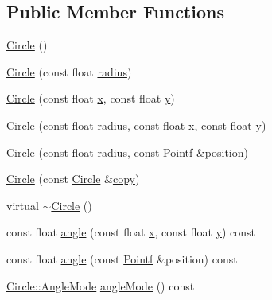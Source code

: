 \subsection*{Public Member Functions}
\begin{DoxyCompactItemize}
\item 
\hyperlink{classprism_1_1_circle_aff41793f64e90d15a4d89851b1a6b011}{Circle} ()
\item 
\hyperlink{classprism_1_1_circle_a4101ea55c7d90b63648742ef22460150}{Circle} (const float \hyperlink{classprism_1_1_circle_a75afa2c59f92909d6b6edcec338030fb}{radius})
\item 
\hyperlink{classprism_1_1_circle_aa6252ad78c2f76a1a4e15f93087bb2c6}{Circle} (const float \hyperlink{classprism_1_1_circle_ae1f729f8fa34605123628e67b230b6be}{x}, const float \hyperlink{classprism_1_1_circle_a6edc045d912b0d278bd0673af028290e}{y})
\item 
\hyperlink{classprism_1_1_circle_afb53c6e58fcd6cbc9effbe082c580892}{Circle} (const float \hyperlink{classprism_1_1_circle_a75afa2c59f92909d6b6edcec338030fb}{radius}, const float \hyperlink{classprism_1_1_circle_ae1f729f8fa34605123628e67b230b6be}{x}, const float \hyperlink{classprism_1_1_circle_a6edc045d912b0d278bd0673af028290e}{y})
\item 
\hyperlink{classprism_1_1_circle_af972289bbd2440b0436ad024634fb8d8}{Circle} (const float \hyperlink{classprism_1_1_circle_a75afa2c59f92909d6b6edcec338030fb}{radius}, const \hyperlink{classprism_1_1_pointf}{Pointf} \&position)
\item 
\hyperlink{classprism_1_1_circle_a95651a90ca498f4b811b8dee5c56dfba}{Circle} (const \hyperlink{classprism_1_1_circle}{Circle} \&\hyperlink{namespaceprism_ae776f4cd825f79e7af1cf6ee1d90a209}{copy})
\item 
virtual \hyperlink{classprism_1_1_circle_afd2b70b3774cc92caf8c8a4b7af0fcd2}{$\sim$\+Circle} ()
\item 
const float \hyperlink{classprism_1_1_circle_ad4b91cf13b593a67abf9782db3fec5d9}{angle} (const float \hyperlink{classprism_1_1_circle_ae1f729f8fa34605123628e67b230b6be}{x}, const float \hyperlink{classprism_1_1_circle_a6edc045d912b0d278bd0673af028290e}{y}) const 
\item 
const float \hyperlink{classprism_1_1_circle_aeee2c0f59b94feb4dd3535950157d614}{angle} (const \hyperlink{classprism_1_1_pointf}{Pointf} \&position) const 
\item 
\hyperlink{classprism_1_1_circle_a74c7c532b4eb120b9227b7fabeffe6ac}{Circle\+::\+Angle\+Mode} \hyperlink{classprism_1_1_circle_a0aa261d16ff55088e5695820fa95e09b}{angle\+Mode} () const 

\end{DoxyCompactItemize}
